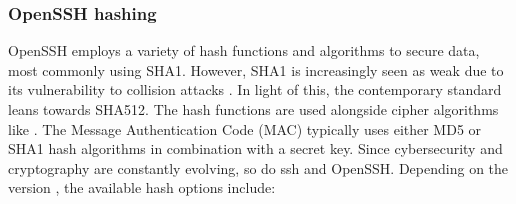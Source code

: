     \subsubsection{OpenSSH hashing}\label{subsubsec:background:ssh:hashing}
    OpenSSH employs a variety of hash functions and algorithms to secure data, most commonly using SHA1. However, SHA1 is increasingly seen as weak due to its vulnerability to collision attacks \cite{OpenSSHUnderHood07}. In light of this, the contemporary standard leans towards SHA512. The hash functions are used alongside cipher algorithms like  \cite{SmartKex22}. The Message Authentication Code (MAC) typically uses either MD5 or SHA1 hash algorithms in combination with a secret key. Since cybersecurity and cryptography are constantly evolving, so do \acrshort{ssh} and OpenSSH. Depending on the version \cite{OpenSSHUnderHood07}, the available hash options include:
    
